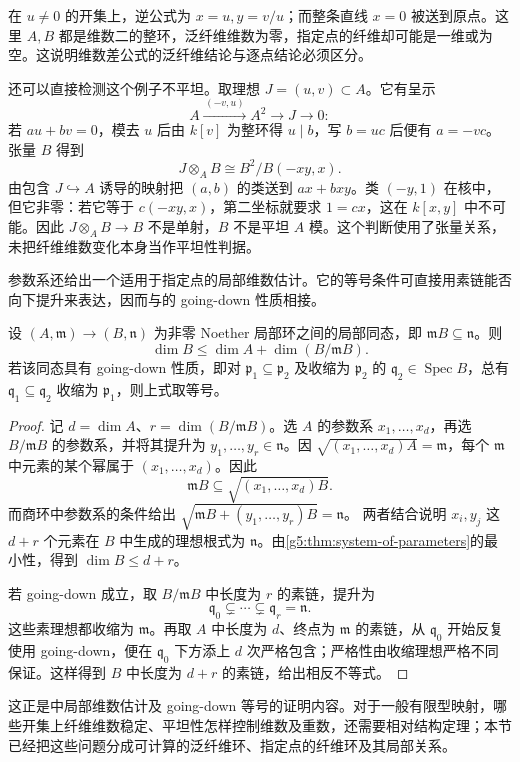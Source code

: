 在 \(u\ne0\) 的开集上，逆公式为 \(x=u,y=v/u\)；而整条直线 \(x=0\) 被送到原点。这里 \(A,B\) 都是维数二的整环，泛纤维维数为零，指定点的纤维却可能是一维或为空。这说明维数差公式的泛纤维结论与逐点结论必须区分。

\ProseParagraphBreak

还可以直接检测这个例子不平坦。取理想 \(J=(u,v)\subset A\)。它有呈示
\[
	A\xrightarrow{\,(-v,u)\,}A^2\longrightarrow J\longrightarrow0:
\]
若 \(au+bv=0\)，模去 \(u\) 后由 \(k[v]\) 为整环得 \(u\mid b\)，写 \(b=uc\) 后便有 \(a=-vc\)。张量 \(B\) 得到
\[
	J\otimes_A B\cong B^2/B(-xy,x).
\]
由包含 \(J\hookrightarrow A\) 诱导的映射把 \((a,b)\) 的类送到 \(ax+bxy\)。类 \((-y,1)\) 在核中，但它非零：若它等于 \(c(-xy,x)\)，第二坐标就要求 \(1=cx\)，这在 \(k[x,y]\) 中不可能。因此 \(J\otimes_A B\rightarrow B\) 不是单射，\(B\) 不是平坦 \(A\) 模。这个判断使用了张量关系，未把纤维维数变化本身当作平坦性判据。

\ProseParagraphBreak

参数系还给出一个适用于指定点的局部维数估计。它的等号条件可直接用素链能否向下提升来表达，因而与的 going-down 性质相接。

\begin{proposition}
\label{g5:prop:local-fiber-dimension-inequality}
	设 \((A,\mathfrak m)\rightarrow(B,\mathfrak n)\) 为非零 Noether 局部环之间的局部同态，即 \(\mathfrak mB\subseteq\mathfrak n\)。则
	\[
		\dim B\leq\dim A+\dim(B/\mathfrak mB).
	\]
	若该同态具有 going-down 性质，即对 \(\mathfrak p_1\subseteq\mathfrak p_2\) 及收缩为 \(\mathfrak p_2\) 的 \(\mathfrak q_2\in\operatorname{Spec}B\)，总有 \(\mathfrak q_1\subseteq\mathfrak q_2\) 收缩为 \(\mathfrak p_1\)，则上式取等号。
\end{proposition}
\begin{proof}
	记 \(d=\dim A\)、\(r=\dim(B/\mathfrak mB)\)。选 \(A\) 的参数系 \(x_1,\ldots,x_d\)，再选 \(B/\mathfrak mB\) 的参数系，并将其提升为 \(y_1,\ldots,y_r\in\mathfrak n\)。因 \(\sqrt{(x_1,\ldots,x_d)A}=\mathfrak m\)，每个 \(\mathfrak m\) 中元素的某个幂属于 \((x_1,\ldots,x_d)\)。因此
	\[
		\mathfrak mB\subseteq\sqrt{(x_1,\ldots,x_d)B}.
	\]
	而商环中参数系的条件给出
	\(\sqrt{\mathfrak mB+(y_1,\ldots,y_r)B}=\mathfrak n\)。
	两者结合说明 \(x_i,y_j\) 这 \(d+r\) 个元素在 \(B\) 中生成的理想根式为 \(\mathfrak n\)。由\cref{g5:thm:system-of-parameters}的最小性，得到 \(\dim B\leq d+r\)。

	若 going-down 成立，取 \(B/\mathfrak mB\) 中长度为 \(r\) 的素链，提升为
	\[
		\mathfrak q_0\subsetneq\cdots\subsetneq\mathfrak q_r=\mathfrak n.
	\]
	这些素理想都收缩为 \(\mathfrak m\)。再取 \(A\) 中长度为 \(d\)、终点为 \(\mathfrak m\) 的素链，从 \(\mathfrak q_0\) 开始反复使用 going-down，便在 \(\mathfrak q_0\) 下方添上 \(d\) 次严格包含；严格性由收缩理想严格不同保证。这样得到 \(B\) 中长度为 \(d+r\) 的素链，给出相反不等式。
\end{proof}

这正是\cite[第15节，定理15.1]{Matsumura1989}中局部维数估计及 going-down 等号的证明内容。对于一般有限型映射，哪些开集上纤维维数稳定、平坦性怎样控制维数及重数，还需要相对结构定理；本节已经把这些问题分成可计算的泛纤维环、指定点的纤维环及其局部关系。

